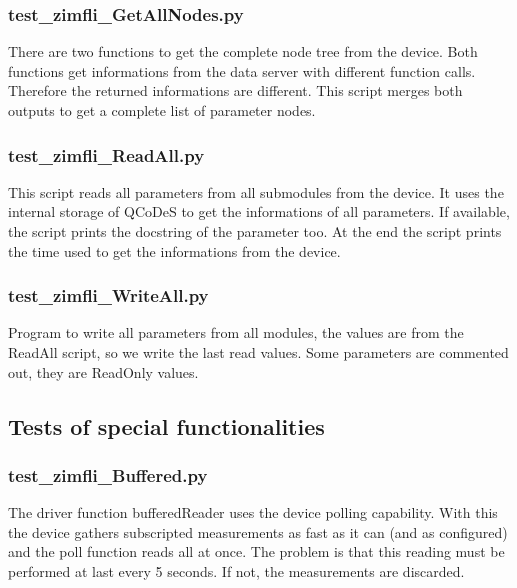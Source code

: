 \documentclass[11pt]{article} %
\begin{document}
\subsubsection{test\_zimfli\_GetAllNodes.py}
There are two functions to get the complete node tree from the device. Both functions get informations from the data server with different function calls. Therefore the returned informations are different. This script merges both outputs to get a complete list of parameter nodes.

\subsubsection{test\_zimfli\_ReadAll.py}
This script reads all parameters from all submodules from the device. It uses the internal storage of QCoDeS to get the informations of all parameters. If available, the script prints the docstring of the parameter too. At the end the script prints the time used to get the informations from the device.

\subsubsection{test\_zimfli\_WriteAll.py}
Program to write all parameters from all modules, the values are from the ReadAll script, so we write the last read values. Some parameters are commented out, they are ReadOnly values.


\subsection{Tests of special functionalities}

\subsubsection{test\_zimfli\_Buffered.py}
The driver function bufferedReader uses the device polling capability. With this the device gathers subscripted measurements as fast as it can (and as configured) and the poll function reads all at once. The problem is that this reading must be performed at last every 5 seconds. If not, the measurements are discarded.
\end{document}
